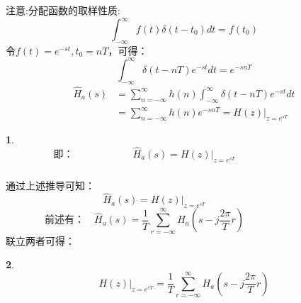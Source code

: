 \documentclass[notheorems,compress,mathserif,table]{beamer}
\newtheorem{dablock}{}
\newtheorem{explain}{说明}
\begin{document}
\begin{frame}[shrink]\frametitle{}%
 注意:分配函数的取样性质:
 $$\int_{-\infty}^{\infty}f(t)\delta(t-t_0)dt = f(t_0)$$
 令$f(t) = e^{-st},t_0 =nT $，可得：
 $$\int_{-\infty}^{\infty}\delta(t-nT)e^{-st}dt = e^{-snT}$$
  \begin{equation*}
  \begin{split}
  \hat{H}_a(s) &=\sum_{n=-\infty}^{\infty}h(n)\int_{-\infty}^{\infty}\delta(t-nT)e^{-st}dt\\
               &= \sum_{n=-\infty}^{\infty}h(n)e^{-snT} =H(z)|_{z=e^{sT}}
  \end{split}
  \end{equation*}
 \begin{dablock}
 $$\mbox{即：}\qquad\qquad\qquad \hat{H}_a(s)= H(z)|_{z=e^{sT}}\qquad\qquad\qquad\qquad$$
\end{dablock}
\end{frame}
%
%
\begin{frame}[allowframebreaks]\frametitle{}%
%
 \quad 通过上述推导可知：
 $$\mbox{}\quad\quad\quad   \hat{H}_a(s)= H(z)|_{z=e^{sT}}\quad\quad\quad\quad\quad\quad\quad\quad\quad$$
 $$\mbox{前述有：}\quad \hat{H}_a(s) = \frac{1}{T}\sum_{r=-\infty}^{\infty}H_a(s-j\frac{2\pi}{T}r)
 \quad\quad\quad\quad\quad\quad\quad\quad$$
 联立两者可得：
 \begin{dablock}
 $$
 H(z)|_{z=e^{sT}}=  \frac{1}{T}          \sum_{r=-\infty}^{\infty}H_a(s-j\frac{2\pi}{T}r)
 $$
 \end{dablock}
\end{frame}
\end{document}
